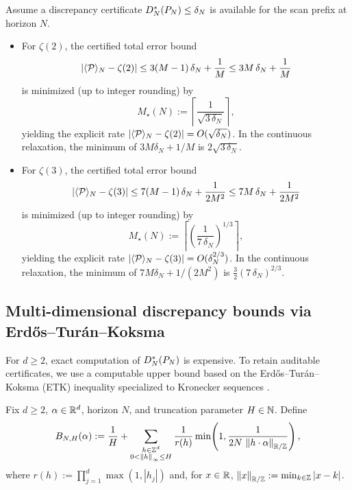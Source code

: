 \begin{corollary}
\label{cor:optimal_truncation}
Assume a discrepancy certificate $D_N^\ast(P_N)\le \delta_N$ is available for the scan prefix at horizon $N$.
\begin{itemize}
\item For $\zeta(2)$, the certified total error bound
\[
\left|\langle \mathcal{P} \rangle_N-\zeta(2)\right|
\le 3(M-1)\,\delta_N+\frac{1}{M}
\le 3M\,\delta_N+\frac{1}{M}
\]
is minimized (up to integer rounding) by
\[
M_\star(N):=\left\lceil \frac{1}{\sqrt{3\,\delta_N}}\right\rceil,
\]
yielding the explicit rate $\left|\langle \mathcal{P} \rangle_N-\zeta(2)\right|=O(\sqrt{\delta_N})$.
In the continuous relaxation, the minimum of $3M\delta_N+1/M$ is $2\sqrt{3\,\delta_N}$.
\item For $\zeta(3)$, the certified total error bound
\[
\left|\langle \mathcal{P} \rangle_N-\zeta(3)\right|
\le 7(M-1)\,\delta_N+\frac{1}{2M^2}
\le 7M\,\delta_N+\frac{1}{2M^2}
\]
is minimized (up to integer rounding) by
\[
M_\star(N):=\left\lceil \left(\frac{1}{7\,\delta_N}\right)^{1/3}\right\rceil,
\]
yielding the explicit rate $\left|\langle \mathcal{P} \rangle_N-\zeta(3)\right|=O(\delta_N^{2/3})$.
In the continuous relaxation, the minimum of $7M\delta_N+1/(2M^2)$ is $\frac{3}{2}(7\,\delta_N)^{2/3}$.
\end{itemize}
\end{corollary}

\subsection{Multi-dimensional discrepancy bounds via Erd\H{o}s--Tur\'an--Koksma}
\label{sec:etk}

For $d\ge 2$, exact computation of $D_N^\ast(P_N)$ is expensive.
To retain auditable certificates, we use a computable upper bound based on the Erd\H{o}s--Tur\'an--Koksma (ETK) inequality specialized to Kronecker sequences \cite{KuipersNiederreiter1974,Niederreiter1992}.

\begin{definition}
\label{def:kronecker_bracket}
Fix $d\ge 2$, $\alpha\in\mathbb{R}^d$, horizon $N$, and truncation parameter $H\in\mathbb{N}$.
Define
\[
B_{N,H}(\alpha)
:=\frac{1}{H}
 +\sum_{\substack{h\in\mathbb{Z}^d\\0<\left\lVert h\right\rVert_{\infty}\le H}}
\frac{1}{r(h)}
\min\!\left(1,\frac{1}{2N\,\left\lVert h\cdot\alpha\right\rVert_{\mathbb{R}/\mathbb{Z}}}\right),
\]
where $r(h):=\prod_{j=1}^d \max(1,|h_j|)$ and, for $x\in\mathbb{R}$, $\left\lVert x\right\rVert_{\mathbb{R}/\mathbb{Z}}:=\min_{k\in\mathbb{Z}}|x-k|$.
\end{definition}

